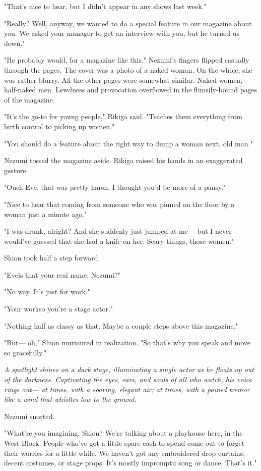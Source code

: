"That's nice to hear, but I didn't appear in any shows last week."

"Really? Well, anyway, we wanted to do a special feature in our magazine
about you. We asked your manager to get an interview with you, but he
turned us down."

"He probably would, for a magazine like this." Nezumi's fingers flipped
casually through the pages. The cover was a photo of a naked woman. On
the whole, she was rather blurry. All the other pages were somewhat
similar. Naked women, half-naked men. Lewdness and provocation
overflowed in the flimsily-bound pages of the magazine.

"It's the go-to for young people," Rikiga said. "Teaches them everything
from birth control to picking up women."

"You should do a feature about the right way to dump a woman next, old
man."

Nezumi tossed the magazine aside. Rikiga raised his hands in an
exaggerated gesture.

"Ouch Eve, that was pretty harsh. I thought you'd be more of a pansy."

"Nice to hear that coming from someone who was pinned on the floor by a
woman just a minute ago."

"I was drunk, alright? And she suddenly just jumped at me--- but I never
would've guessed that she had a knife on her. Scary things, those
women."

Shion took half a step forward.

"Eve\el is that your real name, Nezumi?"

"No way. It's just for work."

"Your work\el so you're a stage actor."

"Nothing half as classy as that. Maybe a couple steps above this
magazine."

"But--- oh," Shion murmured in realization. "So that's why you speak and
move so gracefully."

\emph{A spotlight shines on a dark stage, illuminating a single actor as he
floats up out of the darkness. Captivating the eyes, ears, and souls of
all who watch, his voice rings out--- at times, with a soaring, elegant
air; at times, with a pained tremor like a wind that whistles low to the
ground.}

Nezumi snorted.

"What're you imagining, Shion? We're talking about a playhouse here, in
the West Block. People who've got a little spare cash to spend come out
to forget their worries for a little while. We haven't got any
embroidered drop curtains, decent costumes, or stage props. It's mostly
impromptu song or dance. That's it."

